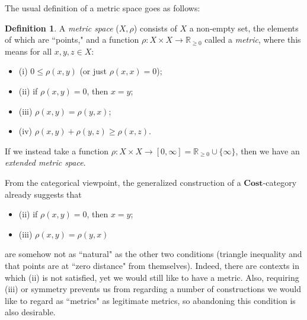 \documentclass[11pt]{book}
\theoremstyle{definition}
\theoremstyle{definition}
\newtheorem{definition}{Definition}[section]
\theoremstyle{definition}
\theoremstyle{theorem}
\theoremstyle{definition}
\begin{document}
The usual definition of a metric space goes as follows:  
\begin{definition}
	A \textit{metric space}  ($X, \rho$) consists of $X$ a non-empty set, the elements of which are ``points," and a function $\rho: X \times X \rightarrow \mathbb{R}_{\geq 0}$ called a \textit{metric}, where this means for all $x,y,z \in X$: 
	\begin{itemize}
		\item (i) $0 \leq \rho(x,y)$ (or just $\rho(x,x) = 0$); 
		\item (ii) if $ \rho(x,y) = 0$, then $x = y$;
		\item (iii) $\rho(x,y) = \rho(y,x)$; 
		\item (iv) $ \rho(x,y) + \rho(y,z) \geq \rho(x,z)$. 
	\end{itemize}
	If we instead take a function $\rho: X \times X \rightarrow [0, \infty] = \mathbb{R}_{\geq 0} \cup \{\infty\}$, then we have an \textit{extended metric space}. 
\end{definition} \noindent 
From the categorical viewpoint, the generalized construction of a $\textbf{Cost}$-category already suggests that 
\begin{itemize}
	\item (ii) if $\rho(x,y) = 0$, then $x = y$;
	\item (iii) $\rho(x,y) = \rho(y,x)$ 
\end{itemize}
are somehow not as ``natural" as the other two conditions (triangle inequality and that points are at ``zero distance" from themselves). Indeed, there are contexts in which (ii) is not satisfied, yet we would still like to have a metric. Also, requiring (iii) or symmetry prevents us from regarding a number of constructions we would like to regard as ``metrics" as legitimate metrics, so abandoning this condition is also desirable. 
\end{document}

